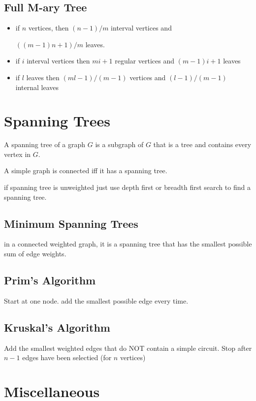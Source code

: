 \documentclass{report}
\begin{document}
\subsection{Full M-ary Tree}
\begin{itemize}
\item
if $n$ vertices, then $(n-1)/m$ interval vertices and 

$((m - 1)n + 1)/m$ leaves.

\item
if $i$ interval vertices then $mi + 1$ regular vertices and $(m-1)i + 1$ leaves

\item
if $l$ leaves then $(ml - 1)/(m - 1)$ vertices and $(l-1)/(m-1)$ internal leaves

\end{itemize}


\section{Spanning Trees}
A spanning tree of a graph $G$ is a subgraph of $G$ that is a tree and contains every vertex in $G$.

A simple graph is connected iff it has a spanning tree.

if spanning tree is unweighted just use depth first or breadth first search to find a spanning tree. 

\subsection{Minimum Spanning Trees}
in a connected weighted graph, it is a spanning tree that has the smallest possible sum of edge weights.

\subsection{Prim's Algorithm}
Start at one node. add the smallest possible edge every time.




\subsection{Kruskal's Algorithm}
Add the smallest weighted edges that do NOT contain a simple circuit. Stop after $n-1$ edges have been selectied (for $n$ vertices)

 
 \newpage
\section{Miscellaneous}
 
\end{document}
